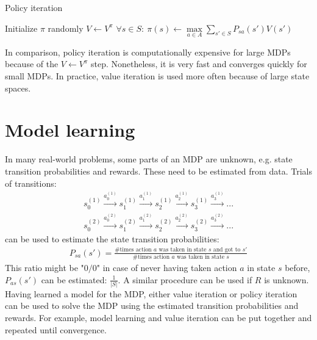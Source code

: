 \documentclass{report}
\begin{document}
\begin{algorithm}[h!]
\caption{Policy iteration}
\label{ref:policyiterationalgorithm}
\begin{algorithmic}
\State Initialize $\pi$ randomly
\Repeat
\State $V\gets V^{\pi}$
\State $\forall s\in S:\:\pi(s)\gets  \max\limits_{a\in A} \sum_{s'\in S} P_{sa}(s')V(s')$
\end{algorithmic}
\end{algorithm}

In comparison, policy iteration is computationally expensive for large MDPs because of the $V\gets V^{\pi}$ step. Nonetheless, it is very fast and converges quickly for small MDPs. In practice, value iteration is used more often because of large state spaces.

\section{Model learning}
In many real-world problems, some parts of an MDP are unknown, e.g. state transition probabilities and rewards. These need to be estimated from data. Trials of transitions:
\begin{align*}
s_0^{(1)}\xrightarrow{a_0^{(1)}}s_1^{(1)}\xrightarrow{a_1^{(1)}}s_2^{(1)}\xrightarrow{a_2^{(1)}}s_3^{(1)}\xrightarrow{a_3^{(1)}}...
\end{align*}
\begin{align*}
s_0^{(2)}\xrightarrow{a_0^{(2)}}s_1^{(2)}\xrightarrow{a_1^{(2)}}s_2^{(2)}\xrightarrow{a_2^{(2)}}s_3^{(2)}\xrightarrow{a_3^{(2)}}...
\end{align*}
can be used to estimate the state transition probabilities:
\begin{align*}
P_{sa}(s')=\frac{\#\mbox{times action } a\mbox{ was taken in state } s \mbox{ and got to }s'} {\#\mbox{times action } a\mbox{ was taken in state } s}
\end{align*}
This ratio might be "$0/0$" in case of never having taken action $a$ in state $s$ before, $P_{as}(s')$ can be estimated: $\frac{1}{\vert S\vert}$. A similar procedure can be used if $R$ is unknown. \\
Having learned a model for the MDP, either value iteration or policy iteration can be used to solve the MDP using the estimated transition probabilities and rewards. For example, model learning and value iteration can be put together and repeated until convergence.
\end{document}
